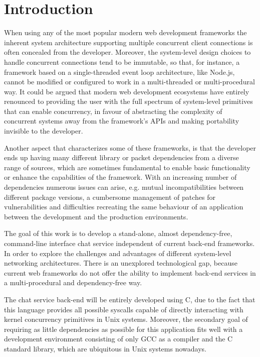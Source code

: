 \section{Introduction}
When using any of the most popular modern web development frameworks the inherent system architecture supporting multiple concurrent client connections is often concealed from the developer. Moreover, the system-level design choices to handle concurrent connections tend to be immutable, so that, for instance, a framework based on a single-threaded event loop architecture, like Node.js, cannot be modified or configured to work in a multi-threaded or multi-procedural way. It could be argued that modern web development ecosystems have entirely renounced to providing the user with the full spectrum of system-level primitives that can enable concurrency, in favour of abstracting the complexity of concurrent systems away from the framework's APIs and making portability invisible to the developer.

Another aspect that characterizes some of these frameworks, is that the developer ends up having many different library or packet dependencies from a diverse range of sources, which are sometimes fundamental to enable basic functionality or enhance the capabilities of the framework. With an increasing number of dependencies numerous issues can arise, e.g. mutual incompatibilities between different package versions, a cumbersome management of patches for vulnerabilities and difficulties recreating the same behaviour of an application between the development and the production environments. 

The goal of this work is to develop a stand-alone, almost dependency-free, command-line interface chat service independent of current back-end frameworks. In order to explore the challenges and advantages of different system-level networking architectures. There is an unexplored technological gap, because current web frameworks do not offer the ability to implement back-end services in a multi-procedural and dependency-free way. 

The chat service back-end will be entirely developed using C, due to the fact that this language provides all possible syscalls capable of directly interacting with kernel concurrency primitives in Unix systems. Moreover, the secondary goal of requiring as little dependencies as possible for this application fits well with a development environment consisting of only GCC as a compiler and the C standard library, which are ubiquitous in Unix systems nowadays. 

